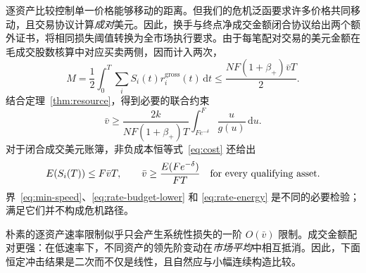 \documentclass[11pt]{article}
\numberwithin{equation}{section}
\theoremstyle{definition}
\theoremstyle{remark}
\newcommand{\dd}{\,\mathrm{d}}
\begin{document}
逐资产比较控制单一价格能够移动的距离。但我们的危机泛函要求许多价格共同移动，且交易协议计算\emph{成对}美元。因此，换手与终点净成交金额闭合协议给出两个额外证书，将相同损失阈值转换为全市场执行要求。由于每笔配对交易的美元金额在毛成交股数核算中对应买卖两侧，因而计入两次，
\begin{equation}\label{eq:rate-turnover}
 M=\frac12\int_0^T\sum_i S_i(t)r_i^{\mathrm{gross}}(t)\dd t
 \le\frac{NF(1+\beta_+)\bar v T}{2}.
\end{equation}
结合定理~\ref{thm:resource}，得到必要的联合约束
\begin{equation}\label{eq:rate-budget-lower}
 \boxed{\ \bar v\ge\frac{2k}{NF(1+\beta_+)T}
 \int_{Fe^{-\delta}}^F\frac{u}{g(u)}\dd u.\ }
\end{equation}
对于闭合成交美元账簿，非负成本恒等式~\eqref{eq:cost} 还给出
\begin{equation}\label{eq:rate-energy}
 E(S_i(T))\le F\bar v T,\qquad
 \bar v\ge \frac{E(Fe^{-\delta})}{FT}
 \quad \hbox{for every qualifying asset.}
\end{equation}
界~\eqref{eq:min-speed}、\eqref{eq:rate-budget-lower} 和 \eqref{eq:rate-energy} 是不同的必要检验；满足它们并不构成危机路径。

朴素的逐资产速率限制似乎只会产生系统性损失的一阶 $O(\bar v)$ 限制。成交金额配对更强：在低速率下，不同资产的领先阶变动在\emph{市场平均}中相互抵消。因此，下面恒定冲击结果是二次而不仅是线性，且自然应与小幅连续构造比较。
\end{document}
